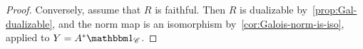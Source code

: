 \documentclass[english,svgnames,table]{article}
\begin{document}
\begin{proof}
        Conversely, assume that $R$ is faithful. Then $R$ is dualizable by~\cref{prop:Gal-dualizable}, and the norm map is an isomorphism by~\cref{cor:Galois-norm-is-iso}, applied to $Y = A^* \ounit_{\cC}$.
    \end{proof}
\end{document}
